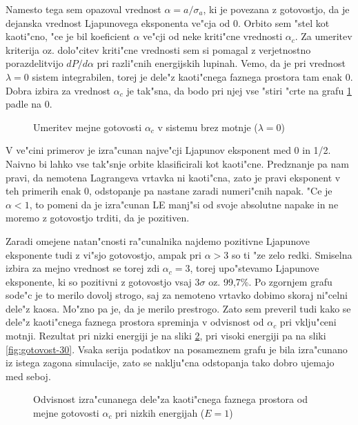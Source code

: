 \documentclass[a4paper,10pt]{article}
\begin{document}
Namesto tega sem opazoval vrednost $\alpha = a/\sigma_a$, ki je povezana z gotovostjo, da je dejanska vrednost Ljapunovega eksponenta ve"cja od 0. Orbito sem "stel kot kaoti"cno, "ce je bil koeficient $\alpha$ ve"cji od neke kriti"cne vrednosti $\alpha_c$. Za umeritev kriterija oz. dolo"citev kriti"cne vrednosti sem si pomagal z verjetnostno porazdelitvijo $dP/d\alpha$ pri razli"cnih energijskih lupinah. Vemo, da je pri vrednost $\lambda=0$ sistem integrabilen, torej je dele"z kaoti"cnega faznega prostora tam enak 0. Dobra izbira za vrednost $\alpha_c$ je tak"sna, da bodo pri njej vse "stiri "crte na grafu \ref{fig:umeritev} padle na 0. 

\begin{figure}[H]
 
 \caption{Umeritev mejne gotovosti $\alpha_c$ v sistemu brez motnje ($\lambda=0$)}
 \label{fig:umeritev}
\end{figure}

V ve"cini primerov je izra"cunan najve"cji Ljapunov eksponent med 0 in 1/2. Naivno bi lahko vse tak"snje orbite klasificirali kot kaoti"cne. Predznanje pa nam pravi, da nemotena Lagrangeva vrtavka ni kaoti"cna, zato je pravi eksponent v teh primerih enak 0, odstopanje pa nastane zaradi numeri"cnih napak. "Ce je $\alpha < 1$, to pomeni da je izra"cunan LE manj"si od svoje absolutne napake in ne moremo z gotovostjo trditi, da je pozitiven. 

Zaradi omejene natan"cnosti ra"cunalnika najdemo pozitivne Ljapunove eksponente tudi z vi"sjo gotovostjo, ampak pri $\alpha > 3$ so ti "ze zelo redki. Smiselna izbira za mejno vrednost se torej zdi $\alpha_c = 3$, torej upo"stevamo Ljapunove eksponente, ki so pozitivni z gotovostjo vsaj $3\sigma$ oz. 99,7\%. Po zgornjem grafu sode"c je to merilo dovolj strogo, saj za nemoteno vrtavko dobimo skoraj ni"celni dele"z kaosa. Mo"zno pa je, da je merilo prestrogo. Zato sem preveril tudi kako se dele"z kaoti"cnega faznega prostora spreminja v odvisnost od $\alpha_c$ pri vklju"ceni motnji. Rezultat pri nizki energiji je na sliki \ref{fig:gotovost-1}, pri visoki energiji pa na sliki \ref{fig:gotovost-30}. Vsaka serija podatkov na posameznem grafu je bila izra"cunano iz istega zagona simulacije, zato se naklju"cna odstopanja tako dobro ujemajo med seboj. 

\begin{figure}[H]
 
 \caption{Odvisnost izra"cunanega dele"za kaoti"cnega faznega prostora od mejne gotovosti $\alpha_c$ pri nizkih energijah ($E=1$)}
 \label{fig:gotovost-1}
\end{figure}
\end{document}
